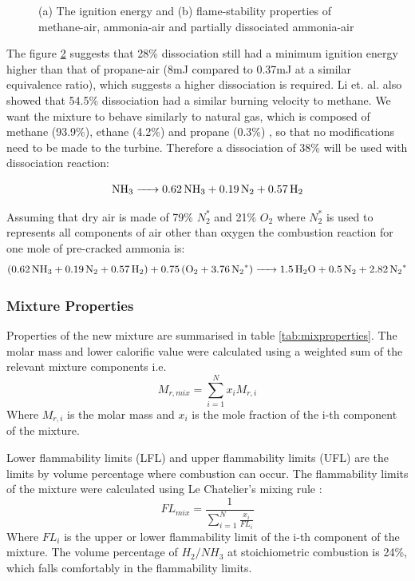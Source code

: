 \begin{figure} [h]
\begin{subfigure}{.5\textwidth}
  \label{fig:sub2}
\end{subfigure}
\caption{(a) The ignition energy and (b) flame-stability properties of methane-air, ammonia-air and partially dissociated ammonia-air \cite{verkamp}}
\label{fig:mixproperties2}
\end{figure} %

The figure \ref{fig:mixproperties2} suggests that 28\% dissociation still had a minimum ignition energy higher than that of propane-air (8mJ compared to 0.37mJ at a similar equivalence ratio), which suggests a higher dissociation is required. Li et. al. \cite{junLi} also showed that 54.5\% dissociation had a similar burning velocity to methane. We want the mixture to behave similarly to natural gas, which is composed of methane (93.9\%), ethane (4.2\%) and propane (0.3\%) \cite{website:uniongas}, so that no modifications need to be made to the turbine. Therefore a dissociation of 38\% will be used with dissociation reaction:

\begin{equation}
\ce{NH_3 -> 0.62 NH_3 + 0.19 N_2 + 0.57 H_2}
\end{equation}

Assuming that dry air is made of 79\% $N_2^*$ and 21\% $O_2$ where $N_2^*$ is used to represents all components of air other than oxygen the combustion reaction for one mole of pre-cracked ammonia is:
\begin{equation}
\ce{(0.62 NH_3 + 0.19 N_2 + 0.57 H_2) + 0.75(O_2 + 3.76 N_2^*) ->1.5H_2O + 0.5N_2 + 2.82N_2^*}
\end{equation}

\subsubsection {Mixture Properties}
Properties of the new mixture are summarised in table \ref{tab:mixproperties}. The molar mass and lower calorific value were calculated using a weighted sum of the relevant mixture components i.e.
\begin{equation}
M_{r, mix} = \sum_{i=1}^{N} x_i M_{r,i}
\end{equation}
Where $M_{r, i}$ is the molar mass and $x_i$ is the mole fraction of the i-th component of the mixture. 

Lower flammability limits (LFL) and upper flammability limits (UFL) are the limits by volume percentage where combustion can occur. The flammability limits of the mixture were calculated using Le Chatelier's mixing rule \cite{chat}: 
\begin{equation}
FL_{mix} = \frac{1}{\sum_{i=1}^{N} \frac{x_i}{FL_i}}
\end{equation}
Where $FL_{i}$ is the upper or lower flammability limit of the i-th component of the mixture. The volume percentage of $H_2/NH_3$ at stoichiometric combustion is 24\%, which falls comfortably in the flammability limits.

